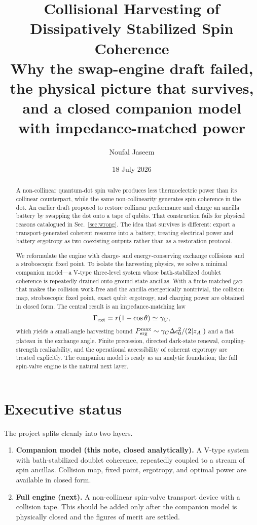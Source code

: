 \documentclass[11pt,a4paper]{article}
\title{\textbf{Collisional Harvesting of Dissipatively Stabilized Spin Coherence}\\[0.35em]
\large Why the swap-engine draft failed, the physical picture that survives,\\
and a closed companion model with impedance-matched power}
\author{Noufal Jaseem}
\date{18 July 2026}
\begin{document}
\maketitle

\begin{abstract}
A non-collinear quantum-dot spin valve produces less thermoelectric power than its collinear counterpart, while the same non-collinearity generates spin coherence in the dot. An earlier draft proposed to restore collinear performance and charge an ancilla battery by swapping the dot onto a tape of qubits. That construction fails for physical reasons catalogued in Sec.~\ref{sec:wrong}. The idea that survives is different: export a transport-generated coherent resource into a battery, treating electrical power and battery ergotropy as two coexisting outputs rather than as a restoration protocol.

We reformulate the engine with charge- and energy-conserving exchange collisions and a stroboscopic fixed point. To isolate the harvesting physics, we solve a minimal companion model---a V-type three-level system whose bath-stabilized doublet coherence is repeatedly drained onto ground-state ancillas. With a finite matched gap that makes the collision work-free and the ancilla energetically nontrivial, the collision map, stroboscopic fixed point, exact qubit ergotropy, and charging power are obtained in closed form. The central result is an impedance-matching law
\[
\Gamma_{\rm ext}=r(1-\cos\theta)\simeq\gamma_C,
\]
which yields a small-angle harvesting bound $P_{\rm erg}^{\rm max}\sim\gamma_C\Delta c_0^2/(2|z_A|)$ and a flat plateau in the exchange angle. Finite precession, directed dark-state renewal, coupling-strength realizability, and the operational accessibility of coherent ergotropy are treated explicitly. The companion model is ready as an analytic foundation; the full spin-valve engine is the natural next layer.
\end{abstract}

\tableofcontents
\newpage

\section{Executive status}

The project splits cleanly into two layers.

\begin{enumerate}
\item \textbf{Companion model (this note, closed analytically).}
 A V-type system with bath-stabilized doublet coherence, repeatedly coupled to a stream of spin ancillas. Collision map, fixed point, ergotropy, and optimal power are available in closed form.
\item \textbf{Full engine (next).}
 A non-collinear spin-valve transport device with a collision tape. This should be added only after the companion model is physically closed and the figures of merit are settled.
\end{enumerate}
\end{document}
